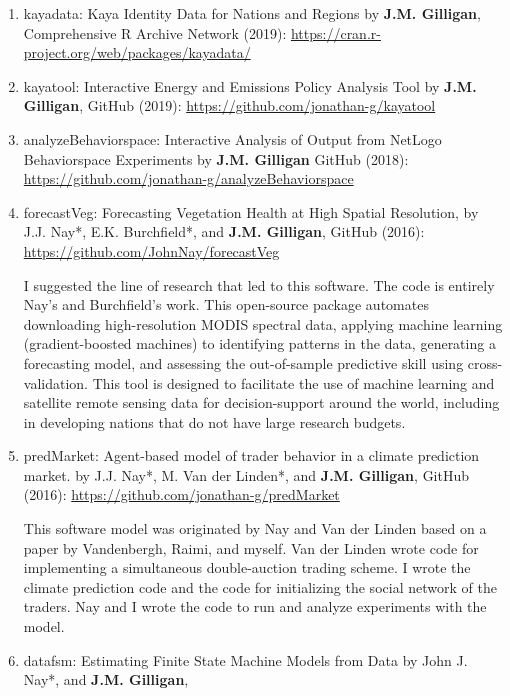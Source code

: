 %
%
\begin{enumerate}
%
\item
kayadata: Kaya Identity Data for Nations and Regions
by \textbf{J.M. Gilligan},
Comprehensive R Archive Network (2019): \url{https://cran.r-project.org/web/packages/kayadata/}
%
\item
kayatool: Interactive Energy and Emissions Policy Analysis Tool
by \textbf{J.M. Gilligan},
GitHub (2019): \url{https://github.com/jonathan-g/kayatool}
%
\item
analyzeBehaviorspace: Interactive Analysis of Output from NetLogo Behaviorspace Experiments
by \textbf{J.M. Gilligan}
GitHub (2018): \url{https://github.com/jonathan-g/analyzeBehaviorspace}
%
\item
forecastVeg: Forecasting Vegetation Health  at High Spatial Resolution,
by J.J. Nay*, E.K. Burchfield*, and \textbf{J.M. Gilligan},
GitHub (2016): \url{https://github.com/JohnNay/forecastVeg}
\begin{credit}
I suggested the line of research that led to this software. The code is entirely Nay's and Burchfield's work.
This open-source package automates downloading high-resolution MODIS spectral data, applying machine learning (gradient-boosted machines) to
identifying patterns in the data, generating a forecasting model, and assessing the out-of-sample predictive skill using cross-validation.
This tool is designed to facilitate the use of machine learning and satellite remote sensing data for decision-support
around the world, including in developing nations that do not have large research budgets.
\end{credit}
%
\item predMarket: Agent-based model of trader behavior in a climate prediction market.
by J.J. Nay*, M. Van der Linden*, and \textbf{J.M. Gilligan},
GitHub (2016): \url{https://github.com/jonathan-g/predMarket}
\begin{credit}
    This software model was originated by Nay and Van der Linden based on a paper by Vandenbergh, Raimi,
    and myself.
    Van der Linden wrote code for implementing a simultaneous double-auction trading scheme.
    I wrote the climate prediction code and the code for initializing the social network of the traders.
    Nay and I wrote the code to run and analyze experiments with the model.
\end{credit}
%
\item
datafsm: Estimating Finite State Machine Models from Data
by John J. Nay*, and \textbf{J.M. Gilligan},

\end{enumerate}
